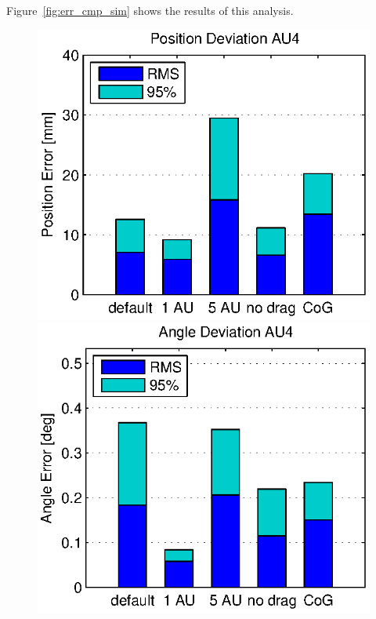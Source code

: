 Figure~\ref{fig:err_cmp_sim} shows the results of this analysis.

\begin{figure}[hbtp]
\centering
\includegraphics[scale=.72]{images/results/err_cmp_sim_pos.eps}
\includegraphics[scale=.72]{images/results/err_cmp_sim_angle.eps}

\end{figure}
